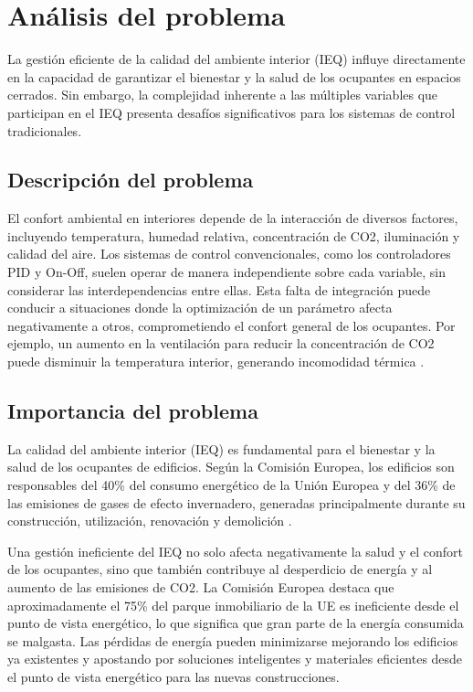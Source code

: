 \section{Análisis del problema}

La gestión eficiente de la calidad del ambiente interior (IEQ) influye directamente en la capacidad de garantizar el bienestar y la salud de los ocupantes en espacios cerrados. Sin embargo, la complejidad inherente a las múltiples variables que participan en el IEQ presenta desafíos significativos para los sistemas de control tradicionales.

\subsection{Descripción del problema}

El confort ambiental en interiores depende de la interacción de diversos factores, incluyendo temperatura, humedad relativa, concentración de CO2, iluminación y calidad del aire. Los sistemas de control convencionales, como los controladores PID y On-Off, suelen operar de manera independiente sobre cada variable, sin considerar las interdependencias entre ellas. Esta falta de integración puede conducir a situaciones donde la optimización de un parámetro afecta negativamente a otros, comprometiendo el confort general de los ocupantes. Por ejemplo, un aumento en la ventilación para reducir la concentración de CO2 puede disminuir la temperatura interior, generando incomodidad térmica \parencite{molina2013unifying}.

\subsection{Importancia del problema}

La calidad del ambiente interior (IEQ) es fundamental para el bienestar y la salud de los ocupantes de edificios. Según la Comisión Europea, los edificios son responsables del 40\% del consumo energético de la Unión Europea y del 36\% de las emisiones de gases de efecto invernadero, generadas principalmente durante su construcción, utilización, renovación y demolición \parencite{ComisiónEuropea2020}.

Una gestión ineficiente del IEQ no solo afecta negativamente la salud y el confort de los ocupantes, sino que también contribuye al desperdicio de energía y al aumento de las emisiones de CO2. La Comisión Europea destaca que aproximadamente el 75\% del parque inmobiliario de la UE es ineficiente desde el punto de vista energético, lo que significa que gran parte de la energía consumida se malgasta. Las pérdidas de energía pueden minimizarse mejorando los edificios ya existentes y apostando por soluciones inteligentes y materiales eficientes desde el punto de vista energético para las nuevas construcciones. 

